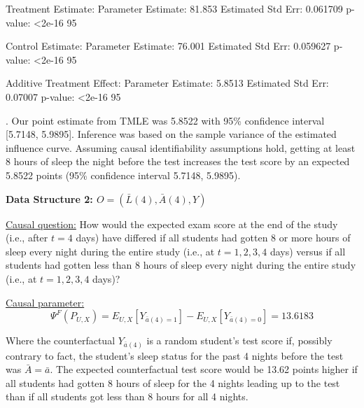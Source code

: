 \documentclass{exam}
\begin{document}
\begin{solution}
\begin{Schunk}
\begin{Soutput}
Treatment Estimate:
   Parameter Estimate:  81.853 
    Estimated Std Err:  0.061709 
              p-value:  <2e-16 
    95%

Control Estimate:
   Parameter Estimate:  76.001 
    Estimated Std Err:  0.059627 
              p-value:  <2e-16 
    95%

Additive Treatment Effect:
   Parameter Estimate:  5.8513 
    Estimated Std Err:  0.07007 
              p-value:  <2e-16 
    95%
\end{Soutput}
\end{Schunk}

. Our point estimate from TMLE was 5.8522 with 95\% confidence interval [5.7148, 5.9895]. Inference was based on the sample variance of the estimated influence curve. Assuming causal identifiability assumptions hold, getting at least 8 hours of sleep the night before the test increases the test score by an expected 5.8522 points (95\% confidence interval 5.7148, 5.9895).


\end{solution}


\noindent\large\textbf{Data Structure 2: $O = (\bar{L}(4), \bar{A}(4), Y)$}
\normalsize


\noindent\underline{Causal question:} How would the expected exam score at the end of the study (i.e., after $t=4$ days) have differed if all students had gotten 8 or more hours of sleep every night during the entire study (i.e., at $t=1,2,3,4$ days) versus if all students had gotten less than 8 hours of sleep every night during the entire study (i.e., at $t=1,2,3,4$ days)?

\noindent\underline{Causal parameter:}
\[
\Psi^F(P_{U,X}) = E_{U,X}[Y_{\bar{a}(4)=1}] - E_{U,X}[Y_{\bar{a}(4)=0}] = 13.6183
\]

Where the counterfactual $Y_{\bar{a}(4)}$ is a random student's test score if, possibly contrary to fact, the student's sleep status for the past 4 nights before the test was $\bar{A} = \bar{a}$. The expected counterfactual test score would be 13.62 points higher if all students had gotten 8 hours of sleep for the 4 nights leading up to the test than if all students got less than 8 hours for all 4 nights.
\end{document}
